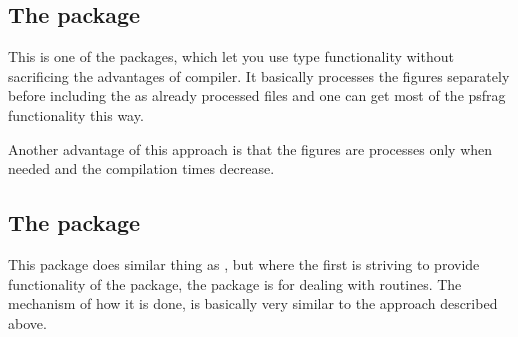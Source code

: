 \documentclass[
]{scrartcl}
\begin{document}
%
\subsection{The  package}

%
This is one of the packages, which let you use  type functionality
    without sacrificing the advantages of  compiler.
%
It basically processes the figures separately before including the as already
    processed  files and one can get most of the psfrag functionality
    this way.

%
Another advantage of this approach is that the figures are processes only when
    needed and the compilation times decrease.

%
\subsection{The  package}

%
This package does similar thing as , but where the first is striving
    to provide functionality of the  package, the 
    package is for dealing with  routines.
%
The mechanism of how it is done, is basically very similar to the approach
    described above.


\end{document}
